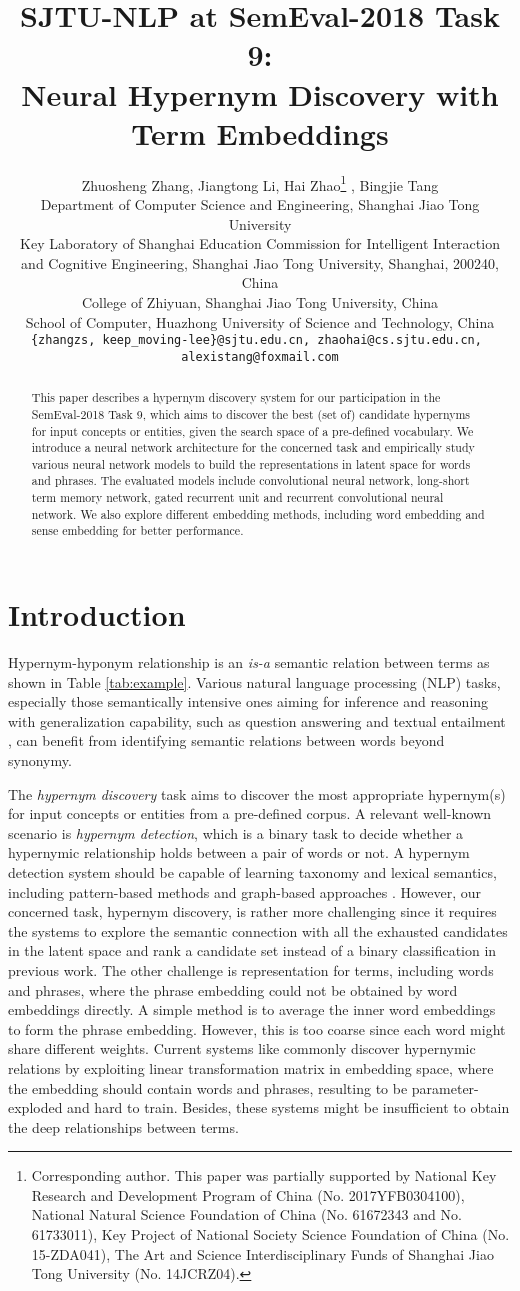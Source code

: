 \documentclass[11pt,a4paper]{article}
\title{SJTU-NLP at SemEval-2018 Task 9: \\ Neural Hypernym Discovery with Term Embeddings}
\author{Zhuosheng Zhang, Jiangtong Li, Hai Zhao\thanks{ Corresponding author. This paper was partially supported by
		National Key Research and Development Program of China (No. 2017YFB0304100),
		National Natural Science Foundation of China (No. 61672343 and No. 61733011),
		Key Project of National Society Science Foundation of China (No. 15-ZDA041),
		The Art and Science Interdisciplinary Funds of Shanghai Jiao Tong University (No. 14JCRZ04).} , Bingjie Tang  \\
	Department of Computer Science and Engineering, Shanghai Jiao Tong University \\
	Key Laboratory of Shanghai Education Commission for Intelligent Interaction \\ and Cognitive Engineering, Shanghai Jiao Tong University, Shanghai, 200240, China\\
	College of Zhiyuan, Shanghai Jiao Tong University, China\\
	School of Computer, Huazhong University of Science and Technology, China\\
	{\tt \{zhangzs, keep\_moving-lee\}@sjtu.edu.cn, zhaohai@cs.sjtu.edu.cn, } \\ {\tt alexistang@foxmail.com}
}
\begin{document}
	\maketitle
	\begin{abstract}
	This paper describes a hypernym discovery system for our participation in the SemEval-2018 Task 9, which aims to discover the best (set of) candidate hypernyms for input concepts or entities, given the search space of a pre-defined vocabulary. We introduce a neural network architecture for the concerned task and empirically study various neural network models to build the representations in latent space for words and phrases. The evaluated models include convolutional neural network, long-short term memory network, gated recurrent unit and recurrent convolutional neural network. We also explore different embedding methods, including word embedding and sense embedding for better performance.  
	\end{abstract}
	
	
	\section{Introduction}
	
	Hypernym-hyponym relationship is an \emph{is-a} semantic relation between terms as shown in Table \ref{tab:example}. Various natural language processing (NLP) tasks, especially those semantically intensive ones aiming for inference and reasoning with generalization capability, such as question answering \cite{Harabagiu2006Methods, Yahya2013Robust} and textual entailment \cite{Dagan2013Recognizing,Roller2016Relations}, can benefit from identifying semantic relations between words beyond synonymy.
	
	The \emph{hypernym discovery} task \cite{semeval2018task9} aims to discover the most appropriate hypernym(s) for input concepts or entities from a pre-defined corpus. A relevant well-known scenario is \emph{hypernym detection}, which is a binary task to decide whether a hypernymic relationship holds between a pair of words or not. A hypernym detection system should be capable of learning taxonomy and lexical semantics, including pattern-based methods \cite{Boella2013Supervised,Espinosa2016ExTaSem} and graph-based approaches \cite{Fountain2012Taxonomy,Velardi2013OntoLearn,Kang2016TaxoFinder}. However, our concerned task, hypernym discovery, is rather more challenging since it requires the systems to explore the semantic connection with all the exhausted candidates in the latent space and rank a candidate set instead of a binary classification in previous work. The other challenge is representation for terms, including words and phrases, where the phrase embedding could not be obtained by word embeddings directly. A simple method is to average the inner word embeddings to form the phrase embedding. However, this is too coarse since each word might share different weights. Current systems like \cite{Espinosa2016Supervised} commonly discover hypernymic relations by exploiting linear transformation matrix in embedding space, where the embedding should contain words and phrases, resulting to be parameter-exploded and hard to train. Besides, these systems might be insufficient to obtain the deep relationships between terms. 
	
\end{document}

